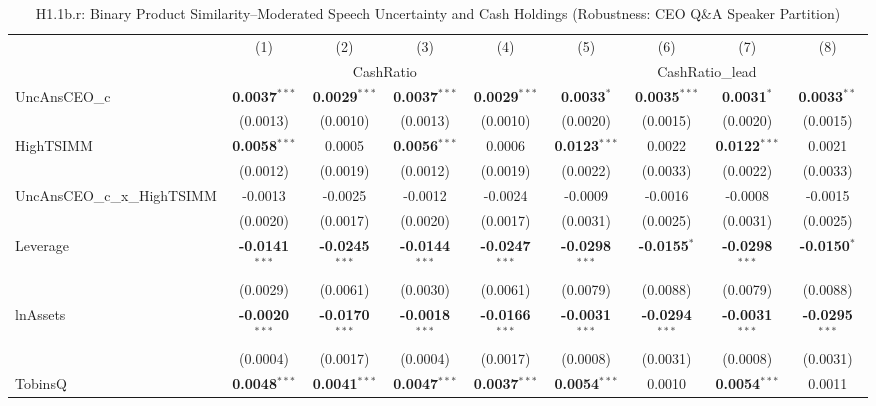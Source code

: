 \begin{landscape}
\begin{table}[H]
\setlength{\tabcolsep}{3pt}
\renewcommand{\arraystretch}{0.85}
\centering
\caption{H1.1b.r: Binary Product Similarity--Moderated Speech Uncertainty and Cash Holdings (Robustness: CEO Q\&A Speaker Partition)}
\label{tab:h1_1b_robust}
\scriptsize
\begin{tabular}{lcccccccc}
\toprule
 & (1) & (2) & (3) & (4) & (5) & (6) & (7) & (8) \\
 & \multicolumn{4}{c}{CashRatio} & \multicolumn{4}{c}{CashRatio\_lead} \\
\cmidrule(lr){2-5} \cmidrule(lr){6-9}
\midrule
UncAnsCEO\_c & \textbf{0.0037}$^{***}$ & \textbf{0.0029}$^{***}$ & \textbf{0.0037}$^{***}$ & \textbf{0.0029}$^{***}$ & \textbf{0.0033}$^{*}$ & \textbf{0.0035}$^{***}$ & \textbf{0.0031}$^{*}$ & \textbf{0.0033}$^{**}$ \\
 & (0.0013) & (0.0010) & (0.0013) & (0.0010) & (0.0020) & (0.0015) & (0.0020) & (0.0015) \\
HighTSIMM & \textbf{0.0058}$^{***}$ & 0.0005 & \textbf{0.0056}$^{***}$ & 0.0006 & \textbf{0.0123}$^{***}$ & 0.0022 & \textbf{0.0122}$^{***}$ & 0.0021 \\
 & (0.0012) & (0.0019) & (0.0012) & (0.0019) & (0.0022) & (0.0033) & (0.0022) & (0.0033) \\
UncAnsCEO\_c\_x\_HighTSIMM & -0.0013 & -0.0025 & -0.0012 & -0.0024 & -0.0009 & -0.0016 & -0.0008 & -0.0015 \\
 & (0.0020) & (0.0017) & (0.0020) & (0.0017) & (0.0031) & (0.0025) & (0.0031) & (0.0025) \\
\midrule
Leverage & \textbf{-0.0141}$^{***}$ & \textbf{-0.0245}$^{***}$ & \textbf{-0.0144}$^{***}$ & \textbf{-0.0247}$^{***}$ & \textbf{-0.0298}$^{***}$ & \textbf{-0.0155}$^{*}$ & \textbf{-0.0298}$^{***}$ & \textbf{-0.0150}$^{*}$ \\
 & (0.0029) & (0.0061) & (0.0030) & (0.0061) & (0.0079) & (0.0088) & (0.0079) & (0.0088) \\
lnAssets & \textbf{-0.0020}$^{***}$ & \textbf{-0.0170}$^{***}$ & \textbf{-0.0018}$^{***}$ & \textbf{-0.0166}$^{***}$ & \textbf{-0.0031}$^{***}$ & \textbf{-0.0294}$^{***}$ & \textbf{-0.0031}$^{***}$ & \textbf{-0.0295}$^{***}$ \\
 & (0.0004) & (0.0017) & (0.0004) & (0.0017) & (0.0008) & (0.0031) & (0.0008) & (0.0031) \\
TobinsQ & \textbf{0.0048}$^{***}$ & \textbf{0.0041}$^{***}$ & \textbf{0.0047}$^{***}$ & \textbf{0.0037}$^{***}$ & \textbf{0.0054}$^{***}$ & 0.0010 & \textbf{0.0054}$^{***}$ & 0.0011 \\

\end{tabular}
\end{table}
\end{landscape}
